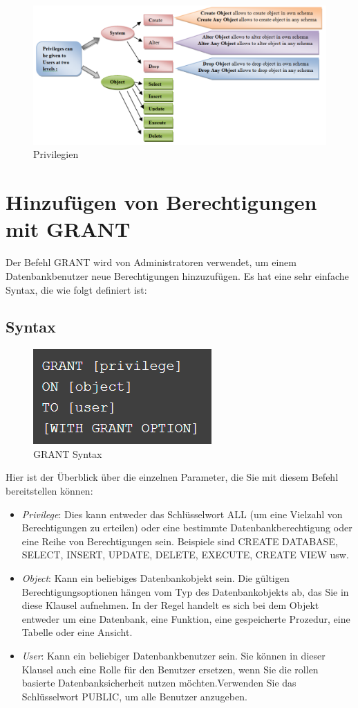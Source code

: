 \begin{figure}[h]
    \centering
    \includegraphics[width=.95\textwidth]{Content/images/dcl/privileges.png}
    \caption{Privilegien}
    \label{fig:privilegien}
 \end{figure}

\section{Hinzufügen von Berechtigungen mit GRANT}
Der Befehl GRANT wird von Administratoren verwendet, um einem Datenbankbenutzer neue Berechtigungen hinzuzufügen. Es hat eine sehr einfache Syntax, die wie folgt definiert ist:

\subsection{Syntax}
\begin{figure}[h]
    \centering
    \includegraphics[width=.30\textwidth]{Content/images/dcl/syntax_grant.png}
    \caption{GRANT Syntax}
    \label{fig:syntax-grant}
 \end{figure}

Hier ist der Überblick über die einzelnen Parameter, die Sie mit diesem Befehl bereitstellen können:

\begin{itemize}
    \item \emph{Privilege}: Dies kann entweder das Schlüsselwort ALL (um eine Vielzahl von Berechtigungen zu erteilen) oder eine bestimmte Datenbankberechtigung oder eine Reihe von Berechtigungen sein. Beispiele sind CREATE DATABASE, SELECT, INSERT, UPDATE, DELETE, EXECUTE, CREATE VIEW usw.
    \item \emph{Object}: Kann ein beliebiges Datenbankobjekt sein. Die gültigen Berechtigungsoptionen hängen vom Typ des Datenbankobjekts ab, das Sie in diese Klausel aufnehmen. In der Regel handelt es sich bei dem Objekt entweder um eine Datenbank, eine Funktion, eine gespeicherte Prozedur, eine Tabelle oder eine Ansicht.
    \item \emph{User}: Kann ein beliebiger Datenbankbenutzer sein. Sie können in dieser Klausel auch eine Rolle für den Benutzer ersetzen, wenn Sie die rollen basierte Datenbanksicherheit nutzen möchten.Verwenden Sie das Schlüsselwort PUBLIC, um alle Benutzer anzugeben.
\end{itemize}

